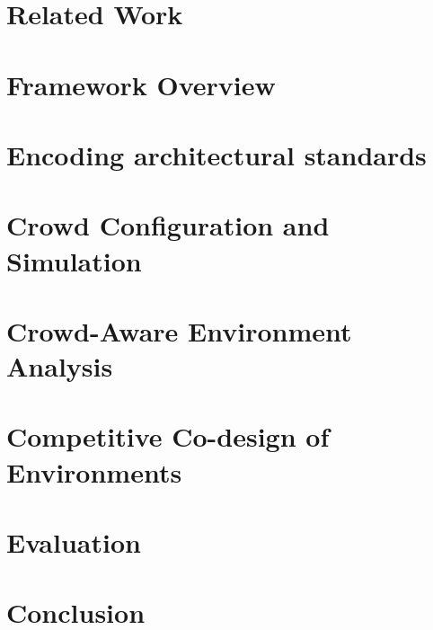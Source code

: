 \documentclass{sigchi}
\begin{document}
\section{Related Work}
\label{section-related-work}


\section{Framework Overview}
\label{section-framework}


\section{Encoding architectural standards}
\label{section-environment}


\section{Crowd Configuration and Simulation}
\label{section-crowd}


\section{Crowd-Aware Environment Analysis}
\label{section-crowdenv}


\section{Competitive Co-design of Environments}
\label{section-IterEnv}


\section{Evaluation}
\label{section-results}


\section{Conclusion}
\label{section-conclusion}


\balance{}



\end{document}

